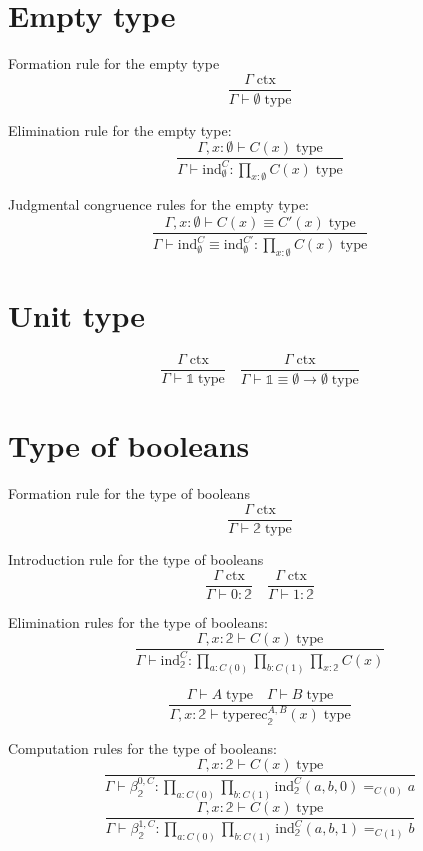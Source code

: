 \documentclass{book}
\begin{document}
\section{Empty type}

Formation rule for the empty type
$$\frac{\Gamma \; \mathrm{ctx}}{\Gamma \vdash \emptyset \; \mathrm{type}}$$

Elimination rule for the empty type:
$$\frac{\Gamma, x:\emptyset \vdash C(x) \; \mathrm{type}}{\Gamma \vdash \mathrm{ind}_\emptyset^C:\prod_{x:\emptyset} C(x) \; \mathrm{type}}$$

Judgmental congruence rules for the empty type:
$$\frac{\Gamma, x:\emptyset \vdash C(x) \equiv C'(x) \; \mathrm{type}}{\Gamma \vdash \mathrm{ind}_\emptyset^C \equiv \mathrm{ind}_\emptyset^{C'}:\prod_{x:\emptyset} C(x) \; \mathrm{type}}$$

\section{Unit type}

$$\frac{\Gamma \; \mathrm{ctx}}{\Gamma \vdash \mathbb{1} \; \mathrm{type}} \quad \frac{\Gamma \; \mathrm{ctx}}{\Gamma \vdash \mathbb{1} \equiv \emptyset \to \emptyset \; \mathrm{type}}$$

\section{Type of booleans}

Formation rule for the type of booleans
$$\frac{\Gamma \; \mathrm{ctx}}{\Gamma \vdash \mathbb{2} \; \mathrm{type}}$$

Introduction rule for the type of booleans
$$\frac{\Gamma \; \mathrm{ctx}}{\Gamma \vdash 0:\mathbb{2}} \quad \frac{\Gamma \; \mathrm{ctx}}{\Gamma \vdash 1:\mathbb{2}}$$

Elimination rules for the type of booleans:
$$\frac{\Gamma, x:\mathbb{2} \vdash C(x) \; \mathrm{type}}{\Gamma \vdash \mathrm{ind}_\mathbb{2}^C:\prod_{a:C(0)} \prod_{b:C(1)} \prod_{x:\mathbb{2}} C(x)}$$

$$\frac{\Gamma \vdash A \; \mathrm{type} \quad \Gamma \vdash B \; \mathrm{type}}{\Gamma, x:\mathbb{2} \vdash \mathrm{typerec}_\mathbb{2}^{A, B}(x) \; \mathrm{type}}$$

Computation rules for the type of booleans:
$$\frac{\Gamma, x:\mathbb{2} \vdash C(x) \; \mathrm{type}}{\Gamma \vdash \beta_\mathbb{2}^{0, C}:\prod_{a:C(0)} \prod_{b:C(1)} \mathrm{ind}_\mathbb{2}^C(a, b, 0) =_{C(0)} a}$$
$$\frac{\Gamma, x:\mathbb{2} \vdash C(x) \; \mathrm{type}}{\Gamma \vdash \beta_\mathbb{2}^{1, C}:\prod_{a:C(0)} \prod_{b:C(1)} \mathrm{ind}_\mathbb{2}^C(a, b, 1) =_{C(1)} b}$$
\end{document}
